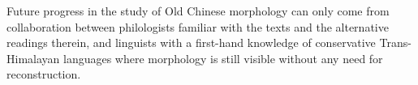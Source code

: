\documentclass[oneside,a4paper,11pt]{article}
\begin{document}
Future progress in the study of Old Chinese morphology can only come from collaboration between philologists familiar with the texts and the alternative readings therein, and linguists with a first-hand knowledge of conservative Trans-Himalayan languages where morphology is still visible without any need for reconstruction.



\end{document}
